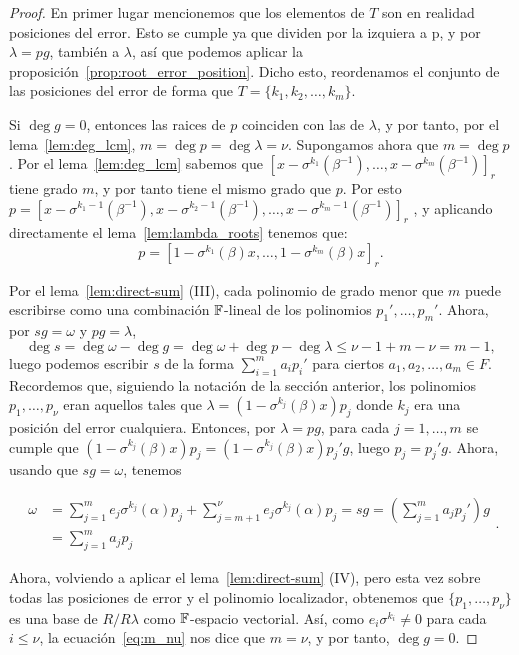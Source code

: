 \begin{proof}
    En primer lugar mencionemos que los elementos de \(T\) son en realidad posiciones del error. Esto se cumple ya que dividen por la izquiera a p, y por \(\lambda = pg\), también a \(\lambda\), así que podemos aplicar la proposición~\ref{prop:root_error_position}. Dicho esto, reordenamos el conjunto de las posiciones del error de forma que \(T = \{k_1, k_2, \ldots, k_m\}\).

    Si \(\deg g = 0\), entonces las raices de \(p\) coinciden con las de  \(\lambda\), y por tanto, por el lema~\ref{lem:deg_lcm}, \(m = \deg p = \deg \lambda = \nu\). Supongamos ahora que \(m = \deg p\). Por el lema~\ref{lem:deg_lcm} sabemos que \( [x - \sigma^{k_1}(\beta^{-1}), \ldots, x - \sigma^{k_m}(\beta^{-1})]_r \) tiene grado \(m\), y por tanto tiene el mismo grado que \(p\). Por esto
\(
p = [x - \sigma^{k_1-1}(\beta^{-1}), x - \sigma^{k_2-1}(\beta^{-1}), \dots, x - \sigma^{k_m-1}(\beta^{-1})]_r
\)
, y aplicando directamente el lema~\ref{lem:lambda_roots} tenemos que:
    \[
    p = {[1 - \sigma^{k_1}(\beta)x, \ldots, 1 - \sigma^{k_m}(\beta)x]}_{r}
    .\]

Por el lema~\ref{lem:direct-sum} (III), cada polinomio de grado menor que \(m\) puede escribirse como una combinación  \(\mathbb{F}\)-lineal de los polinomios  \(p_1', \ldots, p_m'\). Ahora, por \(sg = \omega\) y \(pg = \lambda\),
\[
\deg s = \deg \omega - \deg g = \deg \omega + \deg p - \deg \lambda \le \nu -1 + m - \nu = m-1
,\]
luego podemos escribir \(s\) de la forma \(\sum_{i=1}^{m} a_ip_i'\) para ciertos \(a_1, a_2, \ldots, a_m \in F\). Recordemos que, siguiendo la notación de la sección anterior, los polinomios \(p_1, \ldots, p_\nu\) eran aquellos tales que \(\lambda = (1 - \sigma^{k_j}(\beta)x)p_j\) donde \(k_j\) era una posición del error cualquiera. Entonces, por \(\lambda = pg\), para cada \(j = 1, \ldots, m\) se cumple que \((1 - \sigma ^{k_j}(\beta)x)p_j = (1 - \sigma^{k_j}(\beta)x)p_j'g\), luego \(p_j = p_j'g\). Ahora, usando que \(sg = \omega\), tenemos

\begin{equation}
\label{eq:m_nu}
\begin{aligned}
    \omega &= \sum_{j=1}^{m}e_{j}\sigma^{k_j}(\alpha)p_j + \sum_{j=m+1}^{\nu}e_{j}\sigma^{k_j}(\alpha)p_j = sg  = \left( \sum_{j=1}^{m}a_j p_j' \right) g \\
    &= \sum_{j=1}^{m} a_j p_j
\end{aligned}
.
\end{equation}

Ahora, volviendo a aplicar el lema~\ref{lem:direct-sum} (IV), pero esta vez sobre todas las posiciones de error y el polinomio localizador, obtenemos que \(\{p_1, \ldots, p_{\nu}\}\) es una base de \(R / R\lambda\) como  \(\mathbb{F}\)-espacio vectorial. Así, como \(e_i\sigma^{k_i} \neq 0\) para cada \(i \le \nu\), la ecuación~\ref{eq:m_nu} nos dice que \(m = \nu\), y por tanto, \(\deg g = 0\).
\end{proof}

